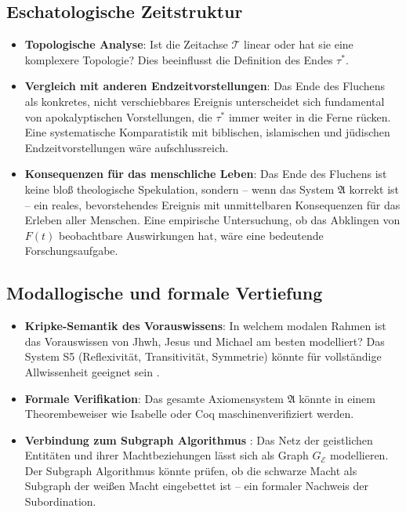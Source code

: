﻿\documentclass[a4paper,12pt]{article}
\theoremstyle{definition}
\begin{document}
\subsection{Eschatologische Zeitstruktur}

\begin{itemize}
  \item \textbf{Topologische Analyse}: Ist die Zeitachse $\mathcal{T}$ linear
        oder hat sie eine komplexere Topologie? Dies beeinflusst die Definition
        des Endes $\tau^*$.
  \item \textbf{Vergleich mit anderen Endzeitvorstellungen}: Das Ende des
        Fluchens als konkretes, nicht verschiebbares Ereignis unterscheidet sich
        fundamental von apokalyptischen Vorstellungen, die $\tau^*$ immer
        weiter in die Ferne rücken. Eine systematische Komparatistik mit
        biblischen, islamischen und jüdischen Endzeitvorstellungen
        \cite{middleton2014} wäre aufschlussreich.
  \item \textbf{Konsequenzen für das menschliche Leben}: Das Ende des Fluchens
        ist keine bloß theologische Spekulation, sondern -- wenn das System
        $\mathfrak{A}$ korrekt ist -- ein reales, bevorstehendes Ereignis mit
        unmittelbaren Konsequenzen für das Erleben aller Menschen. Eine
        empirische Untersuchung, ob das Abklingen von $F(t)$ beobachtbare
        Auswirkungen hat, wäre eine bedeutende Forschungsaufgabe.
\end{itemize}

\subsection{Modallogische und formale Vertiefung}

\begin{itemize}
  \item \textbf{Kripke-Semantik des Vorauswissens}: In welchem modalen Rahmen
        ist das Vorauswissen von Jhwh, Jesus und Michael am besten modelliert?
        Das System S5 (Reflexivität, Transitivität, Symmetrie) könnte für
        vollständige Allwissenheit geeignet sein \cite{kripke1963}.
  \item \textbf{Formale Verifikation}: Das gesamte Axiomensystem $\mathfrak{A}$
        könnte in einem Theorembeweiser wie Isabelle \cite{isabelle2023} oder
        Coq \cite{coq2023} maschinenverifiziert werden.
  \item \textbf{Verbindung zum Subgraph Algorithmus} \cite{epp2026}: Das Netz
        der geistlichen Entitäten und ihrer Machtbeziehungen lässt sich als
        Graph $G_{\mathcal{E}}$ modellieren. Der Subgraph Algorithmus könnte
        prüfen, ob die schwarze Macht als Subgraph der weißen Macht eingebettet
        ist -- ein formaler Nachweis der Subordination.
\end{itemize}
\end{document}
